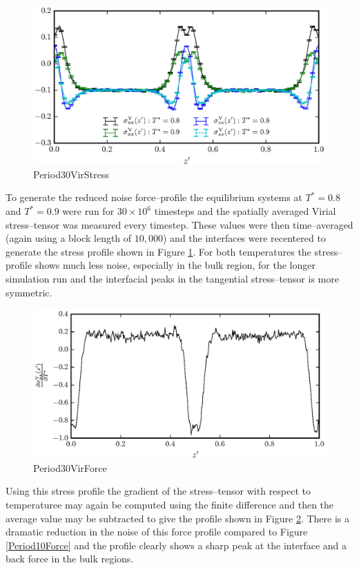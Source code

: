 \begin{figure}[h]
\centering
\includegraphics[scale=0.8]{Period30VirStress}
\caption{Period30VirStress}
\label{Period30VirStress}
\end{figure}

To generate the reduced noise force--profile the equilibrium systems at $T^{*}=0.8$ and $T^{*}=0.9$ were run for $30 \times 10^{6}$ timesteps and the spatially averaged Virial stress--tensor was measured every timestep.
These values were then time--averaged (again using a block length of $10,000$) and the interfaces were recentered to generate the stress profile shown in Figure \ref{Period30VirStress}.
For both temperatures the stress--profile shows much less noise, especially in the bulk region, for the longer simulation run and the interfacial peaks in the tangential stress--tensor is more symmetric.
\FloatBarrier

\begin{figure}[h]
\centering
\includegraphics[scale=0.8]{Period30VirForce}
\caption{Period30VirForce}
\label{Period30VirForce}
\end{figure}
Using this stress profile the gradient of the stress--tensor with respect to temperaturee may again be computed using the finite difference and then the average value may be subtracted to give the profile shown in Figure \ref{Period30VirForce}.
There is a dramatic reduction in the noise of this force profile compared to Figure \ref{Period10Force} and the profile clearly shows a sharp peak at the interface and a back force in the bulk regions.
\FloatBarrier

